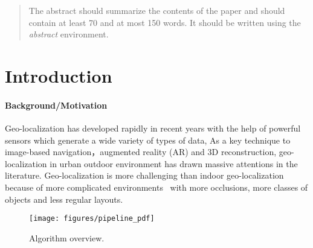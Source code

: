 
\begin{abstract}
The abstract should summarize the contents of the paper and should
contain at least 70 and at most 150 words. It should be written using the
\emph{abstract} environment.
\end{abstract}
%
%

%
%
\section{Introduction}
%
\paragraph{Background/Motivation}
Geo-localization has developed rapidly in recent years with the help of powerful sensors which generate a wide variety of types of data,  
As a key technique to image-based navigation，augmented reality (AR) and 3D reconstruction, geo-localization in urban outdoor environment has drawn massive attentions in the literature.
%
Geo-localization is more challenging than indoor geo-localization because of more complicated environments~\cite{Arth2015a} with more occlusions, more classes of objects and less regular layouts. 
 \begin{figure*}[!tp]
 	\centering
 	\vspace{2.0cm}
 	\texttt{[image: figures/pipeline\_pdf]}
 	\caption{Algorithm overview. }
 	\label{fig:overview}
 \end{figure*}
%
